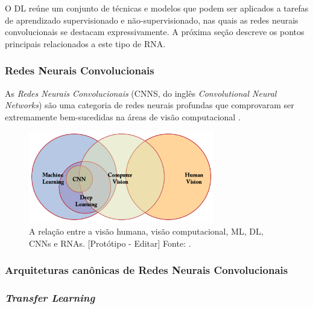 O DL reúne um conjunto de técnicas e modelos que podem ser aplicados a tarefas de aprendizado supervisionado e não-supervisionado, nas quais as redes neurais convolucionais se destacam expressivamente. A próxima seção descreve os pontos principais relacionados a este tipo de RNA.

\subsubsection{Redes Neurais Convolucionais}
\label{subsubsec:cnns}

As \emph{Redes Neurais Convolucionais} (CNNS, do inglês \emph{Convolutional Neural Networks}) são uma categoria de redes neurais profundas que comprovaram ser extremamente bem-sucedidas na áreas de visão computacional \cite{khan}.

\begin{figure}[h!]
\centering
\includegraphics[height=4cm]{imgs/areas-ia}
\caption{A relação entre a visão humana, visão computacional, ML, DL, CNNs e RNAs. [Protótipo - Editar] Fonte: \cite{khan}.}
\label{fig:areas-ia}
\end{figure}



\subsubsection{Arquiteturas canônicas de Redes Neurais Convolucionais}
\label{subsubsec:arq-cnns}

\subsubsection{\emph{Transfer Learning}}
\label{subsubsec:transfer}
